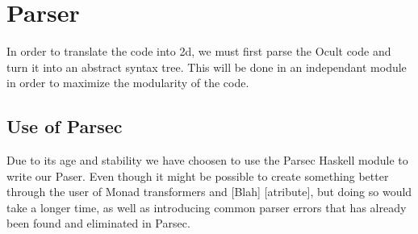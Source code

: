 \section{Parser}
In order to translate the code into 2d, we must first parse the Ocult code and turn it into an abstract syntax tree. This will be done in an independant module in order to maximize the modularity of the code.

\subsection{Use of Parsec}
Due to its age and stability we have choosen to use the Parsec Haskell module to write our Paser. Even though it might be possible to create something better through the user of Monad transformers and [Blah] [atribute], but doing so would take a longer time, as well as introducing common parser errors that has already been found and eliminated in Parsec.

\subsection{}
